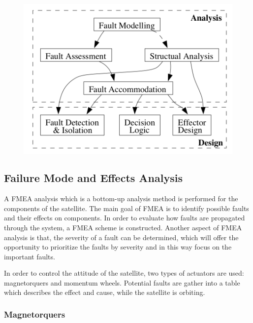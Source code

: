 \begin{table}[H]
\begin{minipage}[b]{0.49\linewidth}
\begin{figure}[H]
			\includegraphics[width=1\linewidth]{figures/FTC_2}
			\caption{ }
			\label{fig:2}
		\end{figure}
	\end{minipage}
\end{table}

\subsection{Failure Mode and Effects Analysis}
A FMEA analysis which is a bottom-up analysis method is performed for the components of the satellite. The main goal of FMEA is to identify possible faults and their effects on components. In order to evaluate how faults are propagated through the system, a FMEA scheme is constructed.
Another aspect of FMEA analysis is that, the severity of a fault can be determined, which will offer the opportunity to prioritize the faults by severity and in this way focus on the important faults.

In order to control the attitude of the satellite, two types of actuators are used: magnetorquers and momentum wheels. Potential faults are gather into a table which describes the effect and cause, while the satellite is orbiting.
\subsubsection{Magnetorquers}

